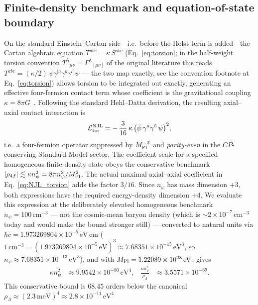 \documentclass[aps,prd,twocolumn,superscriptaddress,showpacs,preprintnumbers,nofootinbib,longbibliography,floatfix]{revtex4-2}
\newcommand{\MPl}{M_{\rm Pl}}
\begin{document}
\subsection{Finite-density benchmark and equation-of-state boundary}
\label{sec:r1_njl}
On the standard Einstein--Cartan side---i.e.\ before the Holst term is
added---the Cartan algebraic equation $T^{abc} = \kappa\,S^{abc}$
(Eq.~\eqref{eq:torsion}; in the half-weight torsion convention
$T^\lambda{}_{\mu\nu} = \Gamma^\lambda{}_{[\mu\nu]}$ of the original
literature this reads $T^{abc} = (\kappa/2)\,
\bar\psi \gamma^{[a}\gamma^b\gamma^{c]} \psi$ --- the two map exactly,
see the convention footnote at Eq.~\eqref{eq:torsion}) allows torsion to
be integrated out exactly, generating an effective four-fermion
contact term whose coefficient is the gravitational coupling
$\kappa = 8\pi G$~\cite{Hehl1976,HehlDattaNJL1971}. Following the standard
Hehl--Datta derivation, the resulting axial--axial contact interaction is
\begin{equation}
\mathcal{L}^{\rm NJL}_{\rm tor}
= -\,\frac{3}{16}\,\kappa\,\bigl(\bar\psi\,\gamma^a\gamma^5\,\psi\bigr)^2,
\label{eq:NJL_torsion}
\end{equation}
i.e.\ a four-fermion operator suppressed by $M_{\rm Pl}^{-2}$ and
\emph{parity-even} in the $C\!P$-conserving Standard Model sector. The
coefficient scale for a specified homogeneous finite-density state obeys the
conservative benchmark
$|\rho_{4f}|\lesssim\kappa n_\psi^2=8\pi n_\psi^2/M_{\rm Pl}^2$.
The actual maximal axial--axial coefficient in Eq.~\eqref{eq:NJL_torsion}
adds the factor $3/16$.  Since $n_\psi$ has mass dimension $+3$, both
expressions have the required energy-density dimension $+4$.
We evaluate this expression at the deliberately elevated homogeneous benchmark
$n_\psi=100\,\text{cm}^{-3}$ --- not the
cosmic-mean baryon density (which is $\sim\!2\times 10^{-7}\,\text{cm}^{-3}$
today and would make the bound stronger still) --- converted to
natural units via $\hbar c = 1.973269804\times 10^{-5}\,\text{eV}\,\text{cm}$
($1\,\text{cm}^{-3} = (1.973269804\times 10^{-5}\,\text{eV})^3
\approx 7.68351\times10^{-15}\,\text{eV}^3$, so
$n_\psi\approx 7.68351\times10^{-13}\,\text{eV}^3$), and with
$\MPl=1.22089\times10^{28}\,\text{eV}$, gives
\begin{align}
\kappa n_\psi^2 &\approx 9.9542\times10^{-80}\,\text{eV}^4,
&\frac{\kappa n_\psi^2}{\rho_\Lambda}&\approx3.5571\times10^{-69}.
\end{align}
This conservative bound is $68.45$ orders below the canonical
$\rho_\Lambda\approx (2.3\,\text{meV})^4 \approx 2.8\times 10^{-11}\,\text{eV}^4$
\end{document}
